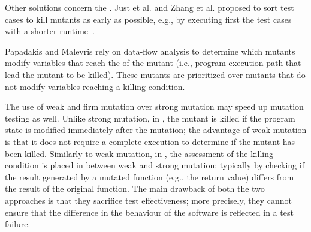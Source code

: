 Other solutions concern the . Just et al. \cite{just2012using} and Zhang et al. \cite{zhang2013faster} proposed to sort test cases to kill mutants as early as possible, e.g., by executing first the test cases with a shorter runtime~\cite{just2012using}. 

Papadakis and Malevris \cite{papadakis2011automatically} rely on data-flow analysis to determine which mutants modify variables that reach the  of the mutant (i.e., program execution path that lead the mutant to be killed). These mutants are prioritized over mutants that do not modify variables reaching a killing condition.


The use of weak and firm mutation over strong mutation may speed up mutation testing as well.
Unlike strong mutation, 
in  \cite{ammann2016introduction}, the mutant is killed if the program state is modified immediately after the mutation; the advantage of weak mutation is that it does not require a complete execution to determine if the mutant has been killed. Similarly to weak mutation, in  \cite{ammann2016introduction}, the assessment of the killing condition is placed in between weak and strong mutation; typically by checking if the result generated by a mutated function (e.g., the return value) differs from the result of the original function. The main drawback of both the two approaches is that they sacrifice test effectiveness; more precisely, they cannot ensure that the difference in the behaviour of the software is reflected in a test failure.


